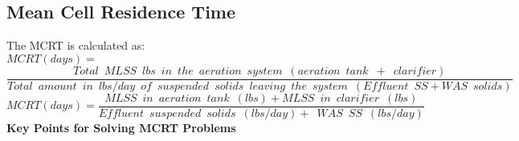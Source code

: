 \subsection{Mean Cell Residence Time}


The MCRT is calculated as:\\  
\vspace{0.2cm}
$MCRT(days) = $\\
$\dfrac{Total \enspace MLSS \enspace lbs \enspace in \enspace the \enspace aeration \enspace system \enspace (aeration \enspace tank \enspace + \enspace clarifier)}{Total \enspace amount \enspace in \enspace lbs/day \enspace of \enspace suspended \enspace solids \enspace leaving  \enspace the \enspace system \enspace(Effluent\enspace SS+ WAS \enspace solids)}$\\
\vspace{0.4cm} 
$MCRT (days) = \dfrac{MLSS \enspace in \enspace aeration \enspace tank \enspace (lbs)+MLSS \enspace in \enspace clarifier \enspace (lbs)}{Effluent \enspace suspended \enspace solids \enspace (lbs/day)+\enspace WAS \enspace SS \enspace (lbs/day)}$\\
\vspace{0.3cm}
\textbf{Key Points for Solving MCRT Problems}\\
